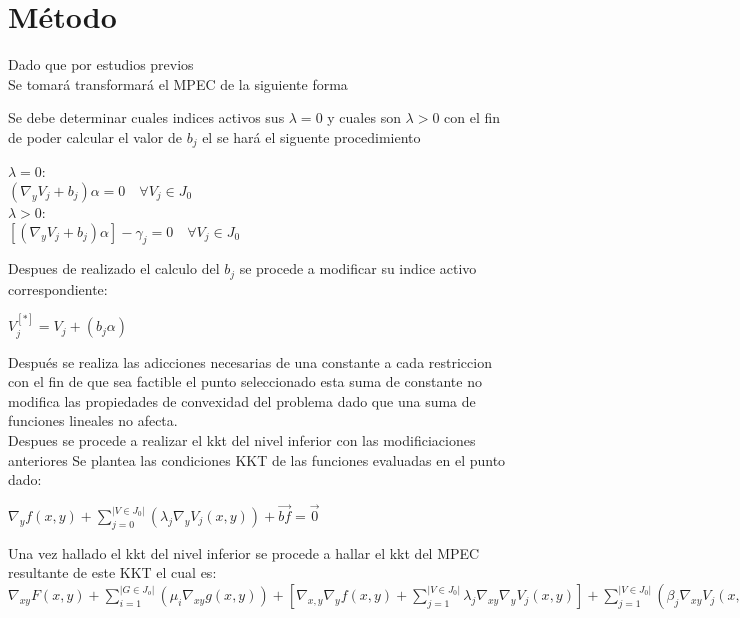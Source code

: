 \chapter{Método}

Dado que por estudios previos\\

Se tomará transformará el MPEC de la siguiente forma

Se debe determinar cuales indices activos sus $\lambda = 0$ y cuales son $\lambda>0$ con el fin de poder calcular el valor de $b_j$ el se hará el siguente procedimiento

\begin{table}[H]
	$\lambda =0$:\\
	$(\nabla_{y}V_j+b_j)\alpha=0 \quad \forall V_j \in J_0$ \\
	$\lambda>0$:\\
	$[(\nabla_{y}V_j+b_j)\alpha]-\gamma_j=0 \quad \forall V_j \in J_0$


\end{table}

Despues de realizado el calculo del $b_j$ se procede a modificar su indice activo correspondiente:

\begin{table}[H]
	$V_{j}^[*]=V_{j}+(b_j\alpha)$
\end{table}

Después se realiza las adicciones necesarias de una constante a cada restriccion con el fin de que sea factible el punto seleccionado
esta suma de constante no modifica las propiedades de convexidad del problema dado que una suma de funciones lineales no afecta.\\


Despues se procede a realizar el kkt del nivel inferior con las modificiaciones anteriores 
Se plantea las condiciones KKT de las funciones evaluadas en el punto dado:
\begin{table}[H]
	$\nabla_{y}f(x,y)+\sum_{j=0}^{|V \in J_0|}(\lambda_j\nabla_{y}V_j(x,y))+\vec{bf}=\vec{0}$
	
\end{table}


Una vez hallado el kkt del nivel inferior se procede a hallar el kkt del MPEC resultante de este KKT el cual es:
$\nabla_{xy}F(x,y)+\sum_{i=1}^{|G \in J_o|}(\mu_i\nabla_{xy}g(x,y))+[\nabla_{x,y}\nabla_{y}f(x,y)+\sum_{j=1}^{|V \in J_0|}\lambda_j\nabla_{xy}\nabla_{y}V_j(x,y)]+\sum_{j=1}^{|V \in J_0|}(\beta_j\nabla_{xy}V_j(x,y))+\vec{BF}=\vec{0}$

